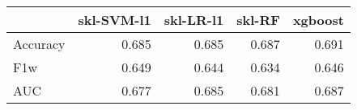 \begin{tabular}{lrrrr}
\toprule
{} &  skl-SVM-l1 &  skl-LR-l1 &  skl-RF &  xgboost \\
\midrule
Accuracy &       0.685 &      0.685 &   0.687 &    0.691 \\
F1w      &       0.649 &      0.644 &   0.634 &    0.646 \\
AUC      &       0.677 &      0.685 &   0.681 &    0.687 \\
\bottomrule
\end{tabular}
